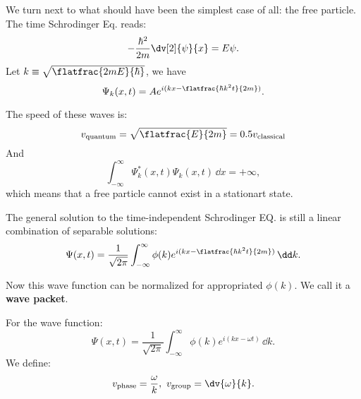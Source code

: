 We turn next to what should have been the simplest case of all: the free particle. The time Schrodinger Eq. reads:
\[
	-\frac{\hbar^2}{2m}\dv[2]{\psi}{x}=E\psi
	.\]
Let $k\equiv\sqrt{\flatfrac{2mE}{\hbar}}$, we have
\[
	\Psi_k(x,t)=Ae^{i(kx-\flatfrac{\hbar k^2t}{2m})}
	.\]
\begin{remark}
	The speed of these waves is:
	\[
		v_{\mathrm{quantum}}=\sqrt{\flatfrac{E}{2m}}=0.5v_{\mathrm{classical}}
	\]
	And
	\[
		\int_{-\infty}^{\infty} \Psi_k^*(x,t)\Psi_k(x,t) \,\dd x=+\infty
		,\] which means that a free particle cannot exist in a stationart state.
\end{remark}
\begin{thm}
	The general solution to the time-independent Schrodinger EQ. is still a linear combination of separable solutions:
	\[
		\Psi(x,t)=\frac{1}{\sqrt{2\pi}}
		\int_{-\infty}^{\infty} \phi(k)e^{i(kx-\flatfrac{\hbar k^2t}{2m})} \,\dd k
		.\]
\end{thm}
Now this wave function can be normalized for appropriated $\phi(k)$. We call it a \textbf{wave packet}.
\begin{defi}
	For the wave function:
	\[
	    \Psi(x,t)=\frac{1}{\sqrt{2\pi}}
		\int_{-\infty}^{\infty} \phi(k)e^{i(kx-\omega t)} \,\dd k
	.\] 
	We define:
	\[
		v_{\mathrm{phase}}=\frac{\omega}{k},\ v_{\mathrm{group}}=\dv{\omega}{k}
	.\] 
\end{defi}





